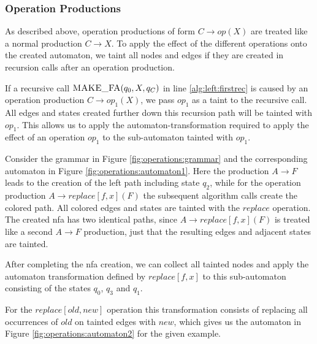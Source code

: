 \subsubsection{Operation Productions}\label{opProduction}

As described above, operation productions of form $C \rightarrow op(X)$ are treated like a normal production $C \rightarrow X$. 
To apply the effect of the different operations onto the created automaton, we taint all nodes and edges if they are created in recursion calls after an operation production.

If a recursive call $\textproc{MAKE\_FA}(q_0, X, q_C)$ in line \ref{alg:left:firstrec} is caused by an operation production $C \rightarrow op_1(X)$, we pass $op_1$ as a taint to the recursive call. All edges and states created further down this recursion path will be tainted with $op_1$. This allows us to apply the automaton-transformation required to apply the effect of an operation $op_1$ to the sub-automaton tainted with $op_1$.

Consider the grammar in Figure \ref{fig:operations:grammar} and the corresponding automaton in Figure \ref{fig:operations:automaton1}. Here the production $A \rightarrow F$ leads to the creation of the left path including state $q_2$, while for the operation production $A \rightarrow replace[f,x](F)$ the subsequent algorithm calls create the colored path. All colored edges and states are tainted with the $replace$ operation. The created \ac{nfa} has two identical paths, since $A \rightarrow replace[f,x](F)$ is treated like a second $A \rightarrow F$ production, just that the resulting edges and adjacent states are tainted.

After completing the \ac{nfa} creation, we can collect all tainted nodes and apply the automaton transformation defined by $replace[f,x]$ to this sub-automaton consisting of the states $q_0$, $q_3$ and $q_1$.

For the $replace[old, new]$ operation this transformation consists of replacing all occurrences of $old$ on tainted edges with $new$, which gives us the automaton in Figure \ref{fig:operations:automaton2} for the given example.



